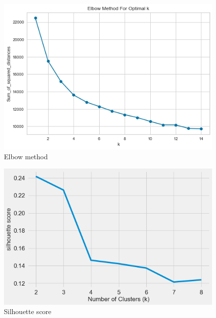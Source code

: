 \documentclass[format=sigconf]{acmart}
\begin{document}
\begin{figure}[H]
    \centering
    \includegraphics[scale=0.45]{elbow_method_1.png}
    \caption{Elbow method}
    \label{fig:elbowMethod}
\end{figure}
\begin{figure}[H]
    \centering
    \includegraphics[scale=0.40]{silhouette_score_1.png}
    \caption{Silhouette score}
    \label{fig:silScore}
\end{figure}
\end{document}
